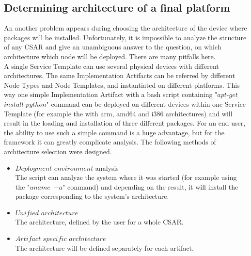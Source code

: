 \subsection{Determining architecture of a final platform}
An another problem appears during choosing the architecture of the device where packages will be installed.
Unfortunately, it is impossible to analyze the structure of any CSAR and give an unambiguous answer to the question, on which architecture which node will be deployed.
There are many pitfalls here.\\
A single Service Template can use several physical devices with different architectures.
The same Implementation Artifacts can be referred by different Node Types and Node Templates, and instantiated on different platforms.
This way one simple Implementation Artifact with a bash script containing "$apt$-$get$ $install$ $python$" command can be deployed on different devices within one Service Template (for example the with arm, amd64 and i386 architectures) and will result in the loading and installation of three different packages. 
For an end user, the ability to use such a simple command is a huge advantage, but for the framework it can greatly complicate analysis.
The following methods of architecture selection were designed.
\begin{itemize}
	\item $Deployment$ $environment$ analysis\\
	The script can analyze the system where it was started (for example using the "$uname$~$-a$" command) and depending on the result, it will install the package corresponding to the system's architecture.
	\item $Unified$ $architecture$\\
	The architecture, defined by the user for a whole CSAR.
	\item $Artifact$ $specific$ $architecture$\\
	The architecture will be defined separately for each artifact.
\end{itemize}

